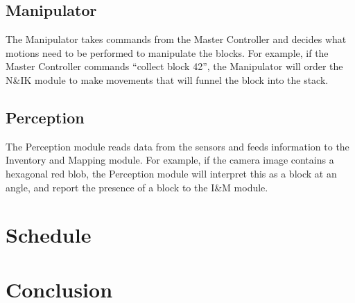 \documentclass[letterpaper,11pt]{article}
\begin{document}
\subsection{Manipulator}
The Manipulator takes commands from the Master Controller
and decides what motions need to be performed to manipulate the blocks.
For example, if the Master Controller commands ``collect block 42'',
the Manipulator will order the N\&IK module to make movements that will funnel the block into the stack.

\subsection{Perception}
The Perception module reads data from the sensors and feeds information to the Inventory and Mapping module.
For example, if the camera image contains a hexagonal red blob,
the Perception module will interpret this as a block at an angle,
and report the presence of a block to the I\&M module.

\section{Schedule}

\section{Conclusion}
\end{document}
